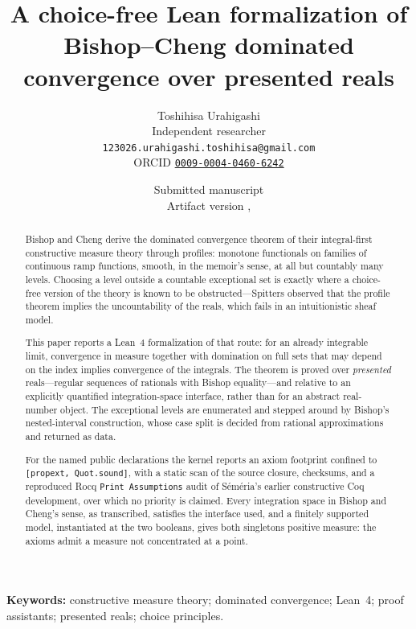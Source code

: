 \documentclass[11pt]{article}
\title{A choice-free Lean formalization of Bishop--Cheng dominated convergence over presented reals}
\author{Toshihisa Urahigashi\\[2pt]
{\normalsize Independent researcher}\\[1pt]
{\normalsize\texttt{123026.urahigashi.toshihisa@gmail.com}}\\[1pt]
{\normalsize ORCID \href{https://orcid.org/0009-0004-0460-6242}{\texttt{0009-0004-0460-6242}}}}
\date{Submitted manuscript\\Artifact version \CFBDCTVersion, \doi{10.5281/zenodo.22333837}}
\theoremstyle{definition}
\theoremstyle{remark}
\begin{document}
\maketitle

\begin{abstract}
Bishop and Cheng derive the dominated convergence theorem of their integral-first constructive measure theory through profiles: monotone functionals on families of continuous ramp functions, smooth, in the memoir's sense, at all but countably many levels.  Choosing a level outside a countable exceptional set is exactly where a choice-free version of the theory is known to be obstructed---Spitters observed that the profile theorem implies the uncountability of the reals, which fails in an intuitionistic sheaf model.

This paper reports a Lean~4 formalization of that route: for an already integrable limit, convergence in measure together with domination on full sets that may depend on the index implies convergence of the integrals.  The theorem is proved over \emph{presented} reals---regular sequences of rationals with Bishop equality---and relative to an explicitly quantified integration-space interface, rather than for an abstract real-number object.  The exceptional levels are enumerated and stepped around by Bishop's nested-interval construction, whose case split is decided from rational approximations and returned as data.

For the named public declarations the kernel reports an axiom footprint confined to \texttt{[propext, Quot.sound]}, with a static scan of the source closure, checksums, and a reproduced Rocq \texttt{Print Assumptions} audit of S\'em\'eria's earlier constructive Coq development, over which no priority is claimed.  Every integration space in Bishop and Cheng's sense, as transcribed, satisfies the interface used, and a finitely supported model, instantiated at the two booleans, gives both singletons positive measure: the axioms admit a measure not concentrated at a point.
\end{abstract}

\noindent\textbf{Keywords:} constructive measure theory; dominated convergence; Lean~4; proof assistants; presented reals; choice principles.
\end{document}
